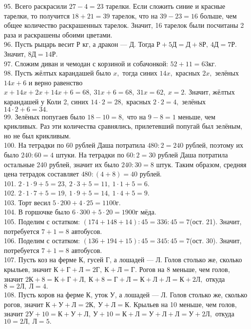95. Всего раскрасили $27-4=23$ тарелки. Если сложить синие и красные тарелки, то получится $18+21=39$ тарелок, что на $39-23=16$ больше, чем общее количество раскрашенных тарелок. Значит, 16 тарелок были посчитаны 2 раза и раскрашены обоими цветами.\\
96. Пусть рыцарь весит Р кг, а дракон --- Д. Тогда $\text{Р}+5\text{Д}=\text{Д}+8\text{Р},\ 4\text{Д}=7\text{Р}.$ Значит, $8\text{Д}=14\text{Р}.$\\
97. Сложим диван и чемодан с корзиной и собачонкой: $52+11=63$кг.\\
98. Пусть жёлтых карандашей было $x,$ тогда синих $14x,$ красных $2x,$ зелёных $14x+6$ и верно равенство $x+14x+2x+14x+6=68,\ 31x+6=68,\ 31x=62,\ x=2.$ Значит, жёлтых карандашей у Коли 2, синих $14\cdot2=28,$ красных $2\cdot2=4,$ зелёных $14\cdot2+6=34.$\\
99. Зелёных попугаев было $18-10=8,$ что на $9-8=1$ меньше, чем крикливых. Раз эти количества сравнялись, прилетевший попугай был зелёным, но не был крикливым.\\
100. На тетрадки по 60 рублей Даша потратила $480:2=240$ рублей, поэтому их было $240:60=4$ штуки. На тетрадки по $60:2=30$ рублей Даша потратила остальные 240 рублей, значит их было $240:30=8$ штук. Таким образом, средняя цена тетрадок составляет $480:(4+8)=40$ рублей.\\
101. $2\cdot1\cdot9+5=23,\ 2\cdot3+5=11,\ 1\cdot1+5=6.$\\
102. $2\cdot1\cdot7+5=19,\ 1\cdot9+5=14,\ 1\cdot4+5=9.$\\
103. Торт весил $5\cdot200+4\cdot25=1100$г.\\
104. В горшочке было $6\cdot300+5\cdot20=1900$г мёда.\\
105. Поделим с остатком: $(174+148+14):45=336:45=7$(ост. 21). Значит, потребуется $7+1=8$ автобусов.\\
106. Поделим с остатком: $(136+194+15):45=345:45=7$(ост. 30). Значит, потребуется $7+1=8$ автобусов.\\
107. Пусть коз на ферме К, гусей Г, а лошадей --- Л. Голов столько же, сколько крыльев, значит $\text{К}+\text{Г}+\text{Л}=2\text{Г},\ \text{К}+\text{Л}=\text{Г}.$ Рогов на 8 меньше, чем голов, значит $2\text{К}+8=\text{К}+\text{Г}+\text{Л},\ \text{К}+8=\text{Г}+\text{Л}=\text{К}+\text{Л}+\text{Л}=\text{К}+2\text{Л},$ откуда $8=2\text{Л},\ \text{Л}=4.$\\
108. Пусть коров на ферме К, уток У, а лошадей --- Л. Голов столько же, сколько рогов, значит $\text{К}+\text{У}+\text{Л}=2\text{К},\ \text{У}+\text{Л}=\text{К}.$ Крыльев на 10 меньше, чем голов, значит $2\text{У}+10=\text{К}+\text{У}+\text{Л},\ \text{У}+10=\text{К}+\text{Л}=\text{У}+\text{Л}+\text{Л}=\text{У}+2\text{Л},$ откуда $10=2\text{Л},\ \text{Л}=5.$\\
